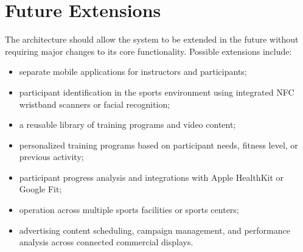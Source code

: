 \documentclass[a4paper,11pt]{article}
\begin{document}
\section{Future Extensions}

The architecture should allow the system to be extended in the future without requiring major changes to its core functionality. Possible extensions include:

\begin{itemize}
    \item separate mobile applications for instructors and participants;
    \item participant identification in the sports environment using integrated NFC wristband scanners or facial recognition;
    \item a reusable library of training programs and video content;
    \item personalized training programs based on participant needs, fitness level, or previous activity;
    \item participant progress analysis and integrations with Apple HealthKit or Google Fit;
    \item operation across multiple sports facilities or sports centers;
    \item advertising content scheduling, campaign management, and performance analysis across connected commercial displays.
\end{itemize}
\end{document}
